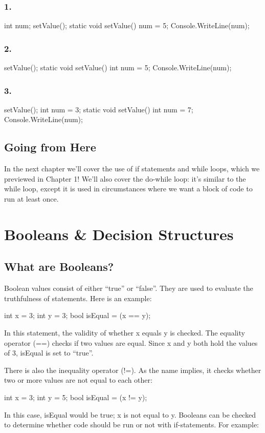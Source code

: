 \documentclass[oneside, openany] {book}
\begin{document}
\subsection*{1.}
\begin{CSharp}
int num;
setValue();
static void setValue()
{
    num = 5;
}
Console.WriteLine(num);
\end{CSharp}
\subsection*{2.}
\begin{CSharp}
setValue();
static void setValue()
{
    int num = 5;
}
Console.WriteLine(num);
\end{CSharp}
\subsection*{3.}
\begin{CSharp}
setValue();
int num = 3;
static void setValue()
{
int num = 7;
}
Console.WriteLine(num);
\end{CSharp}
\section*{Going from Here}
In the next chapter we'll cover the use of if statements and while loops, which we previewed in Chapter 1! We'll also cover the do-while loop: it's similar to the while loop, except it is used in circumstances where we want a block of code to run at least once.
\chapter{Booleans \& Decision Structures}
\minitoc
\section{What are Booleans?}
Boolean values consist of either “true” or “false”. They are used to evaluate the truthfulness of statements. Here is an example:
\begin{CSharp}
int x = 3;
int y = 3;
bool isEqual = (x == y);


\end{CSharp}
\index{==}
In this statement, the validity of whether x equals y is checked. The equality operator (==) checks if two values are equal. Since x and y both hold the values of 3, isEqual is set to “true”.

\index{!=}
There is also the inequality operator (!=). As the name implies, it checks whether two or more values are not equal to each other:
\begin{CSharp}
int x = 3;
int y = 5;
bool isEqual = (x != y);
\end{CSharp}
In this case, isEqual would be true; x is not equal to y.
Booleans can be checked to determine whether code should be run or not with if-statements. For example:
\end{document}

